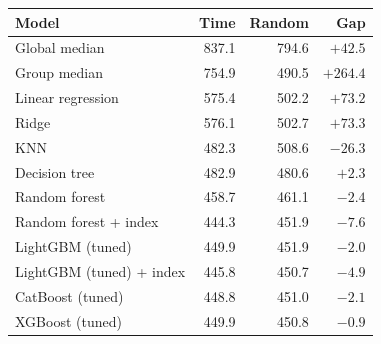\begin{tabular}{lrrr}
\hline
\textbf{Model} & \textbf{Time} & \textbf{Random} & \textbf{Gap} \\
\hline
Global median & 837.1 & 794.6 & $+42.5$ \\
Group median & 754.9 & 490.5 & $+264.4$ \\
Linear regression & 575.4 & 502.2 & $+73.2$ \\
Ridge & 576.1 & 502.7 & $+73.3$ \\
KNN & 482.3 & 508.6 & $-26.3$ \\
Decision tree & 482.9 & 480.6 & $+2.3$ \\
Random forest & 458.7 & 461.1 & $-2.4$ \\
Random forest + index & 444.3 & 451.9 & $-7.6$ \\
LightGBM (tuned) & 449.9 & 451.9 & $-2.0$ \\
LightGBM (tuned) + index & 445.8 & 450.7 & $-4.9$ \\
CatBoost (tuned) & 448.8 & 451.0 & $-2.1$ \\
XGBoost (tuned) & 449.9 & 450.8 & $-0.9$ \\
\hline
\end{tabular}

